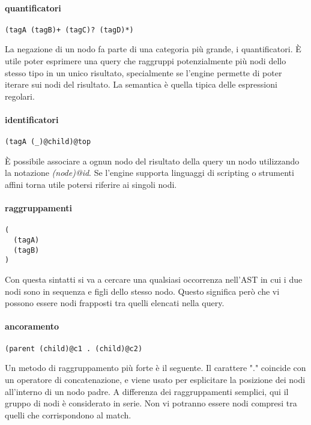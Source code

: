 \paragraph{quantificatori}

\begin{lstlisting}
(tagA (tagB)+ (tagC)? (tagD)*)
\end{lstlisting}

La negazione di un nodo fa parte di una categoria pi\`u grande, i quantificatori.
\`E utile poter esprimere una query che raggruppi potenzialmente pi\`u nodi dello stesso tipo in un unico risultato, specialmente se l'engine permette di poter iterare sui nodi del risultato.
La semantica \`e quella tipica delle espressioni regolari.

\paragraph{identificatori}

\begin{lstlisting}
(tagA (_)@child)@top
\end{lstlisting}

\`E possibile associare a ognun nodo del risultato della query un nodo utilizzando la notazione \emph{(node)@id}.
Se l'engine supporta linguaggi di scripting o strumenti affini torna utile potersi riferire ai singoli nodi.

\paragraph{raggruppamenti}

\begin{lstlisting}
(
  (tagA)
  (tagB)
)
\end{lstlisting}

Con questa sintatti si va a cercare una qualsiasi occorrenza nell'AST in cui i due nodi sono in sequenza e figli dello stesso nodo.
Questo significa per\`o che vi possono essere nodi frapposti tra quelli elencati nella query.

\paragraph{ancoramento}

\begin{lstlisting}
(parent (child)@c1 . (child)@c2)
\end{lstlisting}

Un metodo di raggruppamento pi\`u forte \`e il seguente.
Il carattere "." coincide con un operatore di concatenazione, e viene usato per esplicitare la posizione dei nodi all'interno di un nodo padre.
A differenza dei raggruppamenti semplici, qui il gruppo di nodi \`e considerato in serie.
Non vi potranno essere nodi compresi tra quelli che corrispondono al match.

